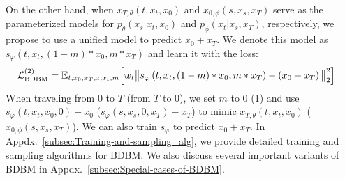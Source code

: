 On the other hand, when $x_{T,\theta}\left(t,x_{t},x_{0}\right)$
and $x_{0,\phi}\left(s,x_{s},x_{T}\right)$ serve as the parameterized
models for $p_{\theta}\left(x_{s}|x_{t},x_{0}\right)$ and $p_{\phi}\left(x_{t}|x_{s},x_{T}\right)$,
respectively, we propose to use a unified model to predict $x_{0}+x_{T}$.
We denote this model as $s_{\varphi}\left(t,x_{t},\left(1-m\right)*x_{0},m*x_{T}\right)$
and learn it with the loss:
\begin{align}
\mathcal{L}_{\text{BDBM}}^{(2)} & =\mathbb{E}_{t,x_{0},x_{T},z,x_{t},m}\Big[w_{t}\big\| s_{\varphi}\left(t,x_{t},\left(1-m\right)*x_{0},m*x_{T}\right)-\left(x_{0}+x_{T}\right)\big\|_{2}^{2}\Big]\label{eq:loss_BDBM_2}
\end{align}
When traveling from 0 to $T$ (from $T$ to 0), we set $m$ to $0$
(1) and use $s_{\varphi}\left(t,x_{t},x_{0},0\right)-x_{0}$ ($s_{\varphi}\left(s,x_{s},0,x_{T}\right)-x_{T}$)
to mimic $x_{T,\theta}\left(t,x_{t},x_{0}\right)$ ($x_{0,\phi}\left(s,x_{s},x_{T}\right)$).
We can also train $s_{\varphi}$ to predict $x_{0}+x_{T}$. In Appdx.~\ref{subsec:Training-and-sampling_alg},
we provide detailed training and sampling algorithms for BDBM. We
also discuss several important variants of BDBM in Appdx.~\ref{subsec:Special-cases-of-BDBM}.
